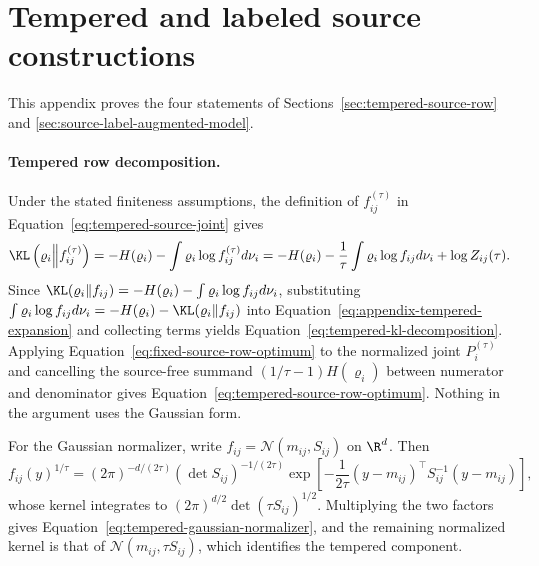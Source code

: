 \section{Tempered and labeled source constructions}
\label{sec:tempered-and-labeled-source-proofs}

This appendix proves the four statements of Sections~\ref{sec:tempered-source-row} and \ref{sec:source-label-augmented-model}.

\paragraph{Tempered row decomposition.}
Under the stated finiteness assumptions, the definition of \(f_{ij}^{(\tau)}\) in Equation~\eqref{eq:tempered-source-joint} gives
\begin{equation}
\KL\left(\varrho_i\middle\Vert f_{ij}^{(\tau)}\right)
=-H(\varrho_i)-\int\varrho_i\log f_{ij}^{(\tau)}d\nu_i
=-H(\varrho_i)-\frac1\tau\int\varrho_i\log f_{ij}d\nu_i
+\log Z_{ij}(\tau).
\label{eq:appendix-tempered-expansion}
\end{equation}
Since \(\KL(\varrho_i\Vert f_{ij})=-H(\varrho_i)-\int\varrho_i\log f_{ij}d\nu_i\), substituting \(\int\varrho_i\log f_{ij}d\nu_i=-H(\varrho_i)-\KL(\varrho_i\Vert f_{ij})\) into Equation~\eqref{eq:appendix-tempered-expansion} and collecting terms yields Equation~\eqref{eq:tempered-kl-decomposition}. Applying Equation~\eqref{eq:fixed-source-row-optimum} to the normalized joint \(P_i^{(\tau)}\) and cancelling the source-free summand \((1/\tau-1)H(\varrho_i)\) between numerator and denominator gives Equation~\eqref{eq:tempered-source-row-optimum}. Nothing in the argument uses the Gaussian form.

For the Gaussian normalizer, write \(f_{ij}=\mathcal N(m_{ij},S_{ij})\) on \(\R^{d}\). Then
\begin{equation}
f_{ij}(y)^{1/\tau}
=(2\pi)^{-d/(2\tau)}\left(\det S_{ij}\right)^{-1/(2\tau)}
\exp\left[-\frac{1}{2\tau}(y-m_{ij})^\top S_{ij}^{-1}(y-m_{ij})\right],
\label{eq:appendix-tempered-gaussian-power}
\end{equation}
whose kernel integrates to \((2\pi)^{d/2}\det(\tau S_{ij})^{1/2}\). Multiplying the two factors gives Equation~\eqref{eq:tempered-gaussian-normalizer}, and the remaining normalized kernel is that of \(\mathcal N(m_{ij},\tau S_{ij})\), which identifies the tempered component.

